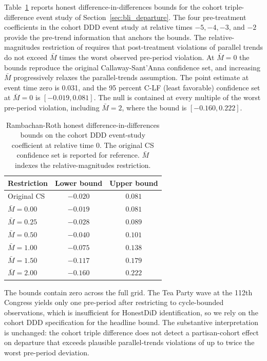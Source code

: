 \documentclass[12pt, a4paper]{article}
\begin{document}
Table~\ref{tab:honest_did} reports honest difference-in-differences bounds for the cohort triple-difference event study of Section~\ref{sec:bli_departure}. The four pre-treatment coefficients in the cohort DDD event study at relative times $-5, -4, -3$, and $-2$ provide the pre-trend information that anchors the bounds. The relative-magnitudes restriction of \citet{rambachan2023honest} requires that post-treatment violations of parallel trends do not exceed $\bar{M}$ times the worst observed pre-period violation. At $\bar{M} = 0$ the bounds reproduce the original Callaway-Sant'Anna confidence set, and increasing $\bar{M}$ progressively relaxes the parallel-trends assumption. The point estimate at event time zero is 0.031, and the 95 percent C-LF (least favorable) confidence set at $\bar{M} = 0$ is $[-0.019, 0.081]$. The null is contained at every multiple of the worst pre-period violation, including $\bar{M} = 2$, where the bound is $[-0.160, 0.222]$.

\begin{table}[H]
\centering
\caption{Rambachan-Roth honest difference-in-differences bounds on the cohort DDD event-study coefficient at relative time 0. The original CS confidence set is reported for reference. $\bar{M}$ indexes the relative-magnitudes restriction.}
\label{tab:honest_did}
\small
\begin{tabular}{lcc}
\toprule
Restriction & Lower bound & Upper bound \\
\midrule
Original CS & $-0.020$ & $0.081$ \\
$\bar{M} = 0.00$ & $-0.019$ & $0.081$ \\
$\bar{M} = 0.25$ & $-0.028$ & $0.089$ \\
$\bar{M} = 0.50$ & $-0.040$ & $0.101$ \\
$\bar{M} = 1.00$ & $-0.075$ & $0.138$ \\
$\bar{M} = 1.50$ & $-0.117$ & $0.179$ \\
$\bar{M} = 2.00$ & $-0.160$ & $0.222$ \\
\bottomrule
\end{tabular}
\end{table}

The bounds contain zero across the full grid. The Tea Party wave at the 112th Congress yields only one pre-period after restricting to cycle-bounded observations, which is insufficient for HonestDiD identification, so we rely on the cohort DDD specification for the headline bound. The substantive interpretation is unchanged: the cohort triple difference does not detect a partisan-cohort effect on departure that exceeds plausible parallel-trends violations of up to twice the worst pre-period deviation.
\end{document}
